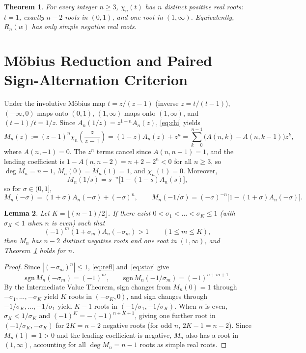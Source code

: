 \documentclass[11pt]{article}
\newtheorem{theorem}{Theorem}
\newtheorem{lemma}[theorem]{Lemma}
\begin{document}
\begin{theorem}\label{thm:main}
For every integer $n \ge 3$, $\chi_n(t)$ has $n$ distinct positive real roots: $t = 1$, exactly $n - 2$ roots in $(0, 1)$, and one root in $(1, \infty)$. Equivalently, $R_n(w)$ has only simple negative real roots.
\end{theorem}

\section{Möbius Reduction and Paired Sign-Alternation Criterion}

Under the involutive Möbius map $t = z / (z - 1)$ (inverse $z = t / (t - 1)$), $(-\infty, 0)$ maps onto $(0, 1)$, $(1, \infty)$ maps onto $(1, \infty)$, and $(t - 1)/t = 1/z$. Since $A_n(1/z) = z^{1 - n} A_n(z)$, \eqref{eq:chi} yields
\[
  M_n(z) := (z - 1)^n \chi_n\!\left(\frac{z}{z - 1}\right) = (1 - z) A_n(z) + z^n = \sum_{k=0}^{n-1} \bigl(A(n, k) - A(n, k - 1)\bigr) z^k,
\]
where $A(n, -1) = 0$. The $z^n$ terms cancel since $A(n, n - 1) = 1$, and the leading coefficient is $1 - A(n, n - 2) = n + 2 - 2^n < 0$ for all $n \ge 3$, so $\deg M_n = n - 1$, $M_n(0) = M_n(1) = 1$, and $\chi_n(1) = 0$. Moreover,
\[
  M_n(1/s) = s^{-n}\bigl[1 - (1 - s) A_n(s)\bigr],
\]
so for $\sigma \in (0, 1]$,
\begin{equation}\label{eq:refl}
  M_n(-\sigma) = (1 + \sigma) A_n(-\sigma) + (-\sigma)^n, \qquad
  M_n(-1/\sigma) = (-\sigma)^{-n}\bigl[1 - (1 + \sigma) A_n(-\sigma)\bigr].
\end{equation}

\begin{lemma}\label{lem:count}
Let $K = \lfloor (n - 1) / 2 \rfloor$. If there exist $0 < \sigma_1 < \dots < \sigma_K \le 1$ (with $\sigma_K < 1$ when $n$ is even) such that
\begin{equation}\label{eq:star}
  (-1)^m (1 + \sigma_m) A_n(-\sigma_m) > 1 \qquad (1 \le m \le K),
\end{equation}
then $M_n$ has $n - 2$ distinct negative roots and one root in $(1, \infty)$, and Theorem~\ref{thm:main} holds for $n$.
\end{lemma}

\begin{proof}
Since $|(-\sigma_m)^n| \le 1$, \eqref{eq:refl} and~\eqref{eq:star} give
\[
  \mathrm{sgn}\, M_n(-\sigma_m) = (-1)^m, \qquad \mathrm{sgn}\, M_n(-1/\sigma_m) = (-1)^{n + m + 1}.
\]
By the Intermediate Value Theorem, sign changes from $M_n(0) = 1$ through $-\sigma_1, \dots, -\sigma_K$ yield $K$ roots in $(-\sigma_K, 0)$, and sign changes through $-1/\sigma_K, \dots, -1/\sigma_1$ yield $K - 1$ roots in $(-1/\sigma_1, -1/\sigma_K)$. When $n$ is even, $\sigma_K < 1/\sigma_K$ and $(-1)^K = -(-1)^{n + K + 1}$, giving one further root in $(-1/\sigma_K, -\sigma_K)$ for $2K = n - 2$ negative roots (for odd $n$, $2K - 1 = n - 2$). Since $M_n(1) = 1 > 0$ and the leading coefficient is negative, $M_n$ also has a root in $(1, \infty)$, accounting for all $\deg M_n = n - 1$ roots as simple real roots.
\end{proof}
\end{document}
